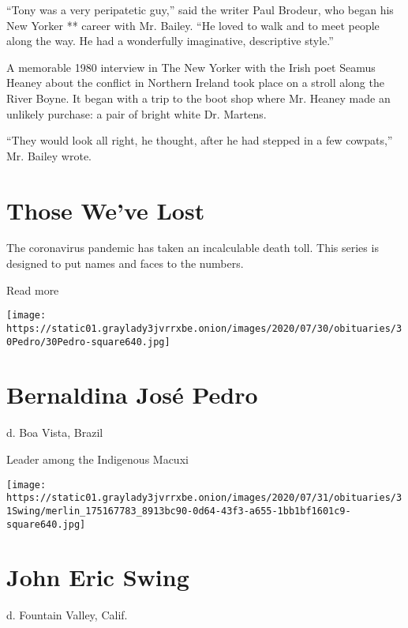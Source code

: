 ``Tony was a very peripatetic guy,'' said the writer Paul Brodeur, who
began his New Yorker ** career with Mr. Bailey. ``He loved to walk and
to meet people along the way. He had a wonderfully imaginative,
descriptive style.''

A memorable 1980 interview in The New Yorker with the Irish poet Seamus
Heaney about the conflict in Northern Ireland took place on a stroll
along the River Boyne. It began with a trip to the boot shop where Mr.
Heaney made an unlikely purchase: a pair of bright white Dr. Martens.

``They would look all right, he thought, after he had stepped in a few
cowpats,'' Mr. Bailey wrote.

\href{https://www.nytimes3xbfgragh.onion/interactive/2020/obituaries/people-died-coronavirus-obituaries.html?action=click\&pgtype=Article\&state=default\&region=BELOW_MAIN_CONTENT\&context=covid_obits_promo}{}

\hypertarget{those-weve-lost}{%
\section{Those We've Lost}\label{those-weve-lost}}

The coronavirus pandemic has taken an incalculable death toll. This
series is designed to put names and faces to the numbers.

Read more

\texttt{[image: https://static01.graylady3jvrrxbe.onion/images/2020/07/30/obituaries/30Pedro/30Pedro-square640.jpg]}

\hypertarget{bernaldina-josuxe9-pedro}{%
\section{Bernaldina José Pedro}\label{bernaldina-josuxe9-pedro}}

d. Boa Vista, Brazil

Leader among the Indigenous Macuxi

\texttt{[image: https://static01.graylady3jvrrxbe.onion/images/2020/07/31/obituaries/31Swing/merlin\_175167783\_8913bc90-0d64-43f3-a655-1bb1bf1601c9-square640.jpg]}

\hypertarget{john-eric-swing}{%
\section{John Eric Swing}\label{john-eric-swing}}

d. Fountain Valley, Calif.

